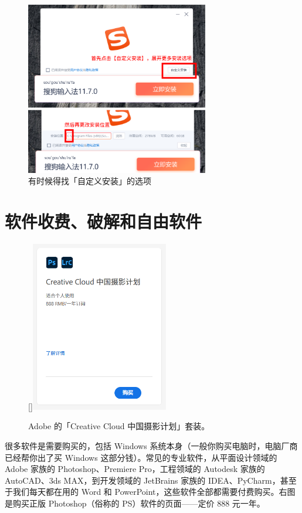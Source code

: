 {{\begin{figure}[htb!]
  \centering
  \includegraphics[width=8cm]{assets/basic/Sogou_change_directory.png}
  \caption{有时候得找「自定义安装」的选项}
  \label{fig:Sogou_change_directory}
\end{figure}

\section{软件收费、破解和自由软件}

\begin{figure}
  \centering
  \raisebox{0pt}[\dimexpr{}\baselineskip\relax]{\includegraphics[width=6cm]{assets/basic/Adobe_PS.png}}
  \caption{Adobe 的「Creative Cloud 中国摄影计划」套装。}
  \label{fig:Adobe_PS}
\end{figure}

很多软件是需要购买的，包括 Windows 系统本身（一般你购买电脑时，电脑厂商已经帮你出了买 Windows 这部分钱）。常见的专业软件，从平面设计领域的 Adobe 家族的 Photoshop、Premiere Pro，工程领域的 Autodesk 家族的 AutoCAD、3ds MAX，到开发领域的 JetBrains 家族的 IDEA、PyCharm，甚至于我们每天都在用的 Word 和 PowerPoint，这些软件全部都需要付费购买。右图是购买正版 Photoshop（俗称的 PS）软件的页面——定价 888 元一年。

}}
